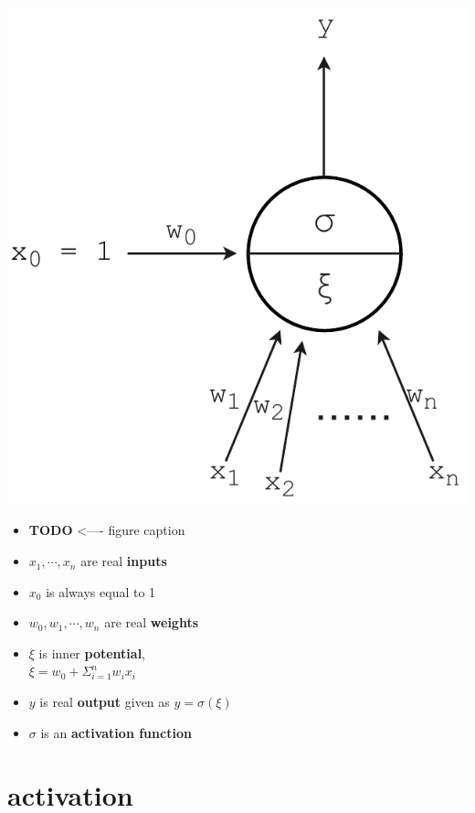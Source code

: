 \begin{minipage}[c]{0.35\textwidth}
\includegraphics[width=\textwidth]{tex/images/perceptron}
\end{minipage}
\hfill
\begin{minipage}[c]{0.55\textwidth}


\begin{itemize}

\item \textbf{TODO} <---- figure caption 
\item $x_1, \cdots, x_n$ are real \textbf{inputs}
\item $x_0$ is always equal to 1
\item $w_0, w_1, \cdots, w_n$ are real \textbf{weights}
\item $\xi$ is inner \textbf{potential}, \\$\xi = w_0 + \Sigma_{i=1}^n w_i x_i$
\item $y$ is real \textbf{output} given as $y = \sigma(\xi)$
\item $\sigma$ is an \textbf{activation function}

\end{itemize}
\end{minipage}

\section{activation}

